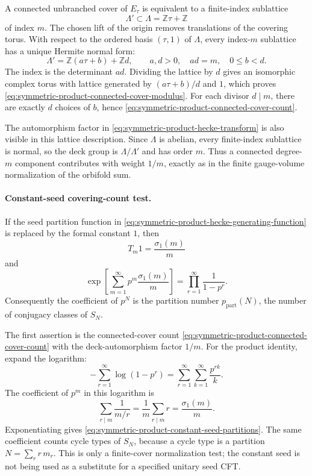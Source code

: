 A connected unbranched cover of \(E_\tau\) is equivalent to a finite-index
sublattice
\[
  \Lambda'\subset \Lambda=\mathbb Z\tau+\mathbb Z
\]
of index \(m\).  The chosen lift of the origin removes translations of the
covering torus.  With respect to the ordered basis \((\tau,1)\) of
\(\Lambda\), every index-\(m\) sublattice has a unique Hermite normal form:
\[
  \Lambda'
  =
  \mathbb Z(a\tau+b)+\mathbb Z d,
  \qquad
  a,d>0,\quad ad=m,\quad 0\le b<d .
\]
The index is the determinant \(ad\).  Dividing the lattice by \(d\) gives an
isomorphic complex torus with lattice generated by
\((a\tau+b)/d\) and \(1\), which proves
\eqref{eq:symmetric-product-connected-cover-modulus}.  For each divisor
\(d\mid m\), there are exactly \(d\) choices of \(b\), hence
\eqref{eq:symmetric-product-connected-cover-count}.

The automorphism factor in
\eqref{eq:symmetric-product-hecke-transform} is also visible in this
lattice description.  Since \(\Lambda\) is abelian, every finite-index
sublattice is normal, so the deck group is \(\Lambda/\Lambda'\) and has
order \(m\).  Thus a connected degree-\(m\) component contributes with weight
\(1/m\), exactly as in the finite gauge-volume normalization of the orbifold
sum.

\paragraph{Constant-seed covering-count test.}
\label{par:symmetric-product-constant-seed-test}
If the seed partition function in
\eqref{eq:symmetric-product-hecke-generating-function} is replaced by the
formal constant \(1\), then
\[
  T_m1=\frac{\sigma_1(m)}m
\]
and
\begin{equation}
  \exp\left[
    \sum_{m=1}^\infty p^m\frac{\sigma_1(m)}m
  \right]
  =
  \prod_{r=1}^\infty\frac1{1-p^r}.
  \label{eq:symmetric-product-constant-seed-partitions}
\end{equation}
Consequently the coefficient of \(p^N\) is the partition number
\(p_{\mathrm{part}}(N)\), the number of conjugacy classes of \(S_N\).

The first assertion is the connected-cover count
\eqref{eq:symmetric-product-connected-cover-count} with the deck-automorphism
factor \(1/m\).  For the product identity, expand
the logarithm:
\[
  -\sum_{r=1}^\infty\log(1-p^r)
  =
  \sum_{r=1}^\infty\sum_{k=1}^\infty \frac{p^{rk}}k .
\]
The coefficient of \(p^m\) in this logarithm is
\[
  \sum_{r\mid m}\frac1{m/r}
  =
  \frac1m\sum_{r\mid m}r
  =
  \frac{\sigma_1(m)}m .
\]
Exponentiating gives \eqref{eq:symmetric-product-constant-seed-partitions}.
The same coefficient counts cycle types of \(S_N\), because a cycle type is a
partition \(N=\sum_r r\,m_r\).  This is only a finite-cover normalization
test; the constant seed is not being used as a substitute for a specified
unitary seed CFT.

